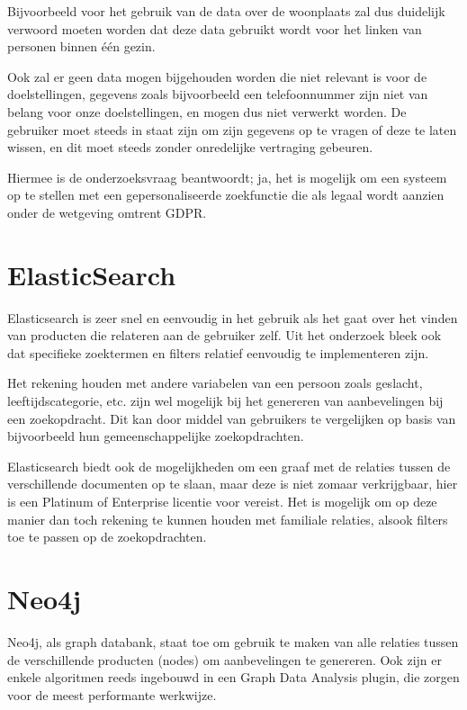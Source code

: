 Bijvoorbeeld voor het gebruik van de data over de woonplaats zal dus duidelijk verwoord moeten worden dat deze data gebruikt wordt voor het linken van personen binnen één gezin.

Ook zal er geen data mogen bijgehouden worden die niet relevant is voor de doelstellingen, gegevens zoals bijvoorbeeld een telefoonnummer zijn niet van belang voor onze doelstellingen, en mogen dus niet verwerkt worden. De gebruiker moet steeds in staat zijn om zijn gegevens op te vragen of deze te laten wissen, en dit moet steeds zonder onredelijke vertraging gebeuren.

Hiermee is de onderzoeksvraag beantwoordt; ja, het is mogelijk om een systeem op te stellen met een gepersonaliseerde zoekfunctie die als legaal wordt aanzien onder de wetgeving omtrent GDPR.

\section{ ElasticSearch}
\label{sec:Conclusie Elasticsearch}

Elasticsearch is zeer snel en eenvoudig in het gebruik als het gaat over het vinden van producten die relateren aan de gebruiker zelf. Uit het onderzoek bleek ook dat specifieke zoektermen en filters relatief eenvoudig te implementeren zijn.

Het rekening houden met andere variabelen van een persoon zoals geslacht, leeftijdscategorie, etc. zijn wel mogelijk bij het genereren van aanbevelingen bij een zoekopdracht. Dit kan door middel van gebruikers te vergelijken op basis van bijvoorbeeld hun gemeenschappelijke zoekopdrachten.

Elasticsearch biedt ook de mogelijkheden om een graaf met de relaties tussen de verschillende documenten op te slaan, maar deze is niet zomaar verkrijgbaar, hier is een Platinum of Enterprise licentie voor vereist. Het is mogelijk om op deze manier dan toch rekening te kunnen houden met familiale relaties, alsook filters toe te passen op de zoekopdrachten.

\section{ Neo4j}
\label{sec:Conclusie Neo4j}

Neo4j, als graph databank, staat toe om gebruik te maken van alle relaties tussen de verschillende producten (nodes) om aanbevelingen te genereren. Ook zijn er enkele algoritmen reeds ingebouwd in een Graph Data Analysis plugin, die zorgen voor de meest performante werkwijze.

